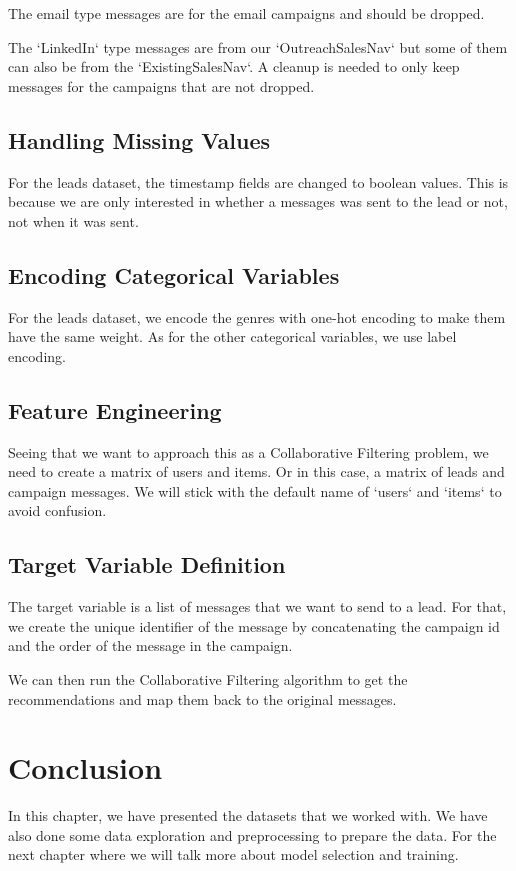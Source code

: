 The email type messages are for the email campaigns and should be dropped.

The `LinkedIn` type messages are from our `OutreachSalesNav` but some of them can also be from the `ExistingSalesNav`. A cleanup is needed to only keep messages for the campaigns
that are not dropped.


\subsection{Handling Missing Values}

For the leads dataset, the timestamp fields are changed to boolean values.
This is because we are only interested in whether a messages was sent to the lead or not, not when it was sent.

\subsection{Encoding Categorical Variables}

For the leads dataset, we encode the genres with one-hot encoding to make them have the same weight.
As for the other categorical variables, we use label encoding.

\subsection{Feature Engineering}
Seeing that we want to approach this as a Collaborative Filtering problem, we need to create a matrix of users and items.
Or in this case, a matrix of leads and campaign messages.
We will stick with the default name of `users` and `items` to avoid confusion.

\subsection{Target Variable Definition}
The target variable is a list of messages that we want to send to a lead.
For that, we create the unique identifier of the message by concatenating the campaign id and the order of the message in the campaign.

We can then run the Collaborative Filtering algorithm to get the recommendations and map them back to the original messages.


\setcounter{secnumdepth}{0} %
\section{Conclusion}
In this chapter, we have presented the datasets that we worked with.
We have also done some data exploration and preprocessing to prepare the data.
For the next chapter where we will talk more about model selection and training.
